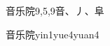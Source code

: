\begin{entry}{音乐院}{9,5,9}{⾳、⼃、⾩}
  \begin{phonetics}{音乐院}{yin1yue4yuan4}
  \end{phonetics}
\end{entry}
